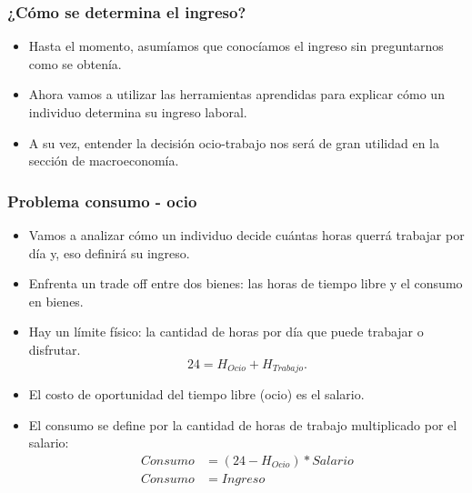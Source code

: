\documentclass{beamer}
\begin{document}
\begin{frame}
\frametitle{¿Cómo se determina el ingreso?}
\begin{itemize}
    \item Hasta el momento, asumíamos que  conocíamos el ingreso sin preguntarnos como se obtenía. 
    \item Ahora vamos a utilizar las herramientas aprendidas para explicar cómo un individuo determina su ingreso laboral.
    \item A su vez, entender la decisión ocio-trabajo nos será de gran utilidad en la sección de macroeconomía. 
\end{itemize}
\end{frame}


\begin{frame}
\frametitle{Problema consumo - ocio}
\begin{itemize}
    \item Vamos a analizar cómo un individuo decide cuántas horas querrá trabajar por día y, eso definirá su ingreso.
    \item Enfrenta un trade off entre dos bienes: las horas de tiempo libre y el consumo en bienes.
    \item Hay un límite físico: la cantidad de horas por día que puede trabajar o disfrutar.
    \begin{equation}
      24 = H_{Ocio} + H_{Trabajo}.
    \end{equation}
    \item El costo de oportunidad del tiempo libre (ocio) es el salario. 
    \item El consumo se define por la cantidad de horas de trabajo multiplicado por el salario:
    \begin{align*}
      Consumo &= (24-H_{Ocio}) * Salario \\
      Consumo &= Ingreso 
    \end{align*}
\end{itemize}
\end{frame}
\end{document}
